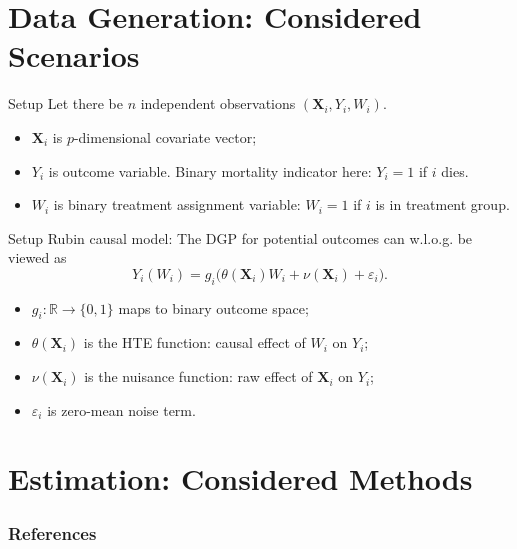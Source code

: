 \documentclass[11pt]{beamer}
\newcommand{\X}{\mathbf{X}}
\begin{document}
\section{Data Generation: Considered Scenarios}

\begin{frame}{Setup}
Let there be $n$ independent observations $(\X_i, Y_i, W_i)$.
\begin{itemize}\setlength\itemsep{1em}
	\item $\X_i$ is $p$-dimensional covariate vector;
	\item $Y_i$ is outcome variable. Binary mortality indicator here: $Y_i=1$ if $i$ dies.
	\item $W_i$ is binary treatment assignment variable: $W_i = 1$ if $i$ is in treatment group.
\end{itemize}
\end{frame}


\begin{frame}{Setup}
Rubin causal model: The DGP for \alert{potential} outcomes can w.l.o.g. be viewed as
\[
	Y_i(W_i) = g_i\Bigg( \theta(\X_i)W_i +  \nu (\X_i) + \varepsilon_i \Bigg).
\]
\begin{itemize}
	\item $g_i:\mathbb{R} \to \{0,1\}$ maps to binary outcome space;
	\item $\theta(\X_i)$ is the HTE function: causal effect of $W_i$ on $Y_i$;
	\item $\nu(\X_i)$ is the nuisance function: raw effect of $\X_i$ on $Y_i$;
	\item $\varepsilon_i$ is zero-mean noise term. 
\end{itemize}

\end{frame}


\section{Estimation: Considered Methods}



\begin{frame}
	\begin{figure}
	\end{figure}
\end{frame}




\begin{frame}[t,allowframebreaks]
\frametitle{References}

\end{frame}
\end{document}

